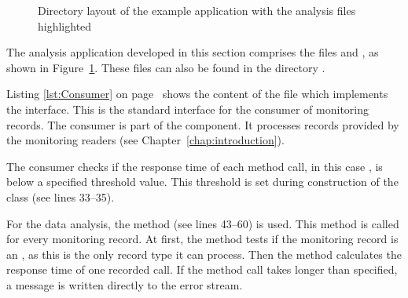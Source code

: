 \begin{figure}[H]
\begin{graybox}
\end{graybox}
\caption{Directory layout of the example application with the analysis files highlighted}
\label{lst:analysisExampleLayout}
\end{figure}

\pagebreak

\noindent The analysis application developed in this section comprises the files %
 and , as shown in Figure~\ref{lst:analysisExampleLayout}. %
These files can also be found in the directory \dir{\manualInstrumentedBookstoreApplicationDirDistro{}/}. 

Listing \ref{lst:Consumer} on page~\pageref{lst:Consumer} shows the content of the  file which implements the  interface. This is the standard interface for the consumer of \Kieker{} monitoring records. The consumer is part of the \KiekerAnalysisPart{} component. It processes records provided by the monitoring readers (see Chapter~\ref{chap:introduction}). %

\setJavaCodeListing       

%

\noindent The consumer checks if the response time of each method call, in this case , is below %
a specified threshold value. %
This threshold is set during construction of the  class (see lines 33--35). 


For the data analysis, the method  (see lines 43--60) is used. %
This method is called for every monitoring record. At first, the method tests if %
the monitoring record is an , as %
this is the only record type it can process. Then the method calculates the %
response time of one recorded  call. If the method call takes %
longer than specified, a message is written directly to the error stream.

